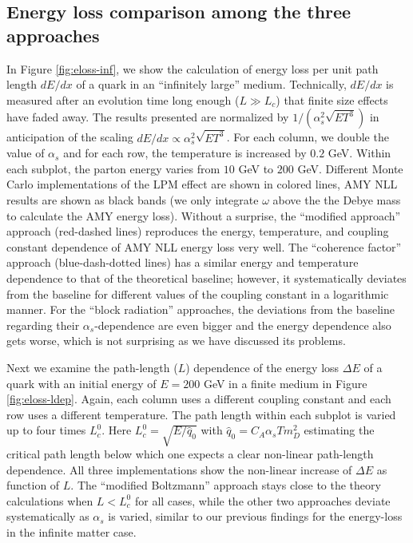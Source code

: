 \subsection{Energy loss comparison among the three approaches}
In Figure \ref{fig:eloss-inf}, we show the calculation of energy loss per unit path length $dE/dx$ of a quark in an ``infinitely large'' medium. 
Technically, $dE/dx$ is measured after an evolution time long enough ($L\gg L_c$) that finite size effects have faded away.
The results presented are normalized by $1/(\alpha_s^2 \sqrt{ET^3})$ in anticipation of the scaling $dE/dx \propto \alpha_s^2 \sqrt{ET^3}$.
For each column, we double the value of $\alpha_s$ and for each row, the temperature is increased by $0.2$ GeV. 
Within each subplot, the parton energy varies from $10$ GeV to $200$ GeV.
Different Monte Carlo implementations of the LPM effect are shown in colored lines, AMY NLL results are shown as black bands (we only integrate $\omega$ above the the Debye mass to calculate the AMY energy loss). 
Without a surprise, the ``modified approach'' approach (red-dashed lines) reproduces the energy, temperature, and coupling constant dependence of AMY NLL energy loss very well.
The ``coherence factor'' approach (blue-dash-dotted lines) has a similar energy and temperature dependence to that of the theoretical baseline; however, it systematically deviates from the baseline for different values of the coupling constant in a logarithmic manner.
For the ``block radiation'' approaches, the deviations from the baseline regarding their $\alpha_s$-dependence are even bigger and the energy dependence also gets worse, which is not surprising as we have discussed its problems.

Next we examine the path-length ($L$) dependence of the energy loss $\Delta E$ of a quark with an initial energy of $E = 200$ GeV in a finite medium in Figure \ref{fig:eloss-ldep}.
Again, each column uses a different coupling constant and each row uses a different temperature. 
The path length within each subplot is varied up to four times $L_c^0$.
Here $L_c^0 = \sqrt{E/\hat{q}_0}$ with $\hat{q}_0 = C_A \alpha_s T m_D^2$ estimating the critical path length below which one expects a clear non-linear path-length dependence.
All three implementations show the non-linear increase of $\Delta E$ as function of $L$.
The ``modified Boltzmann'' approach stays close to the theory calculations when $L<L_c^0$ for all cases, while the other two approaches deviate systematically as $\alpha_s$ is varied, similar to our previous findings for the energy-loss in the infinite matter case.

